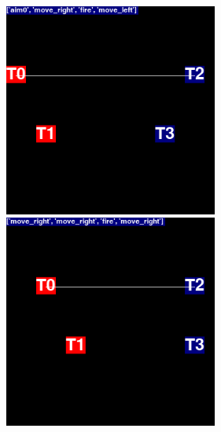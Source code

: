 

\begin{figure}
\centering
\begin{minipage}{.5\textwidth}
  \centering
  \includegraphics[width=7cm]{images/animation01/screenshot0-1.png}
\end{minipage}%
\begin{minipage}{.5\textwidth}
  \centering
  \includegraphics[width=7cm]{images/animation01/screenshot0-2.png}
\end{minipage}
\centering
\begin{minipage}{.5\textwidth}
  \centering

\end{minipage}
\end{figure}
